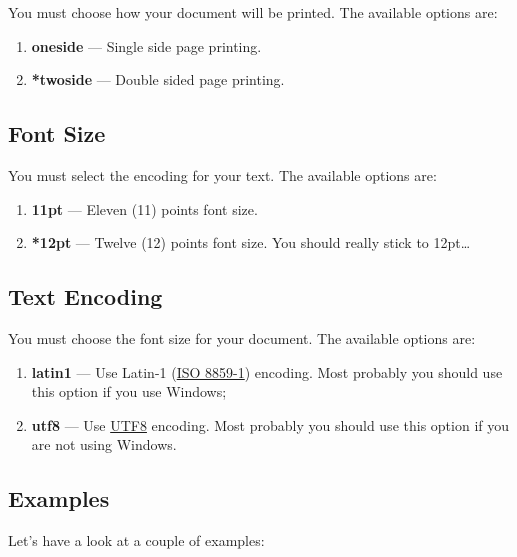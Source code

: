 You must choose how your document will be printed. The available options are:
\begin{enumerate}
	\item \textbf{oneside} --- Single side page printing.
	\item \textbf{*twoside} --- Double sided page printing.
\end{enumerate}

\subsection{Font Size} %
\label{ssec:font_size}

You must select the encoding for your text. The available options are:
\begin{enumerate}
	\item \textbf{11pt} --- Eleven (11) points font size.
	\item \textbf{*12pt} --- Twelve (12) points font size. You should really stick to 12pt\ldots
\end{enumerate}

\subsection{Text Encoding} %
\label{ssec:text_encoding}

You must choose the font size for your document. The available options are:
\begin{enumerate}
	\item \textbf{latin1} --- Use Latin-1 (\href{http://en.wikipedia.org/wiki/ISO/IEC_8859-1}{ISO 8859-1}) encoding.  Most probably you should use this option if you use Windows;
	\item \textbf{utf8} --- Use \href{http://en.wikipedia.org/wiki/UTF-8}{UTF8} encoding.    Most probably you should use this option if you are not using Windows.
\end{enumerate}

\subsection{Examples} %
\label{ssec:examples}

Let's have a look at a couple of examples:

